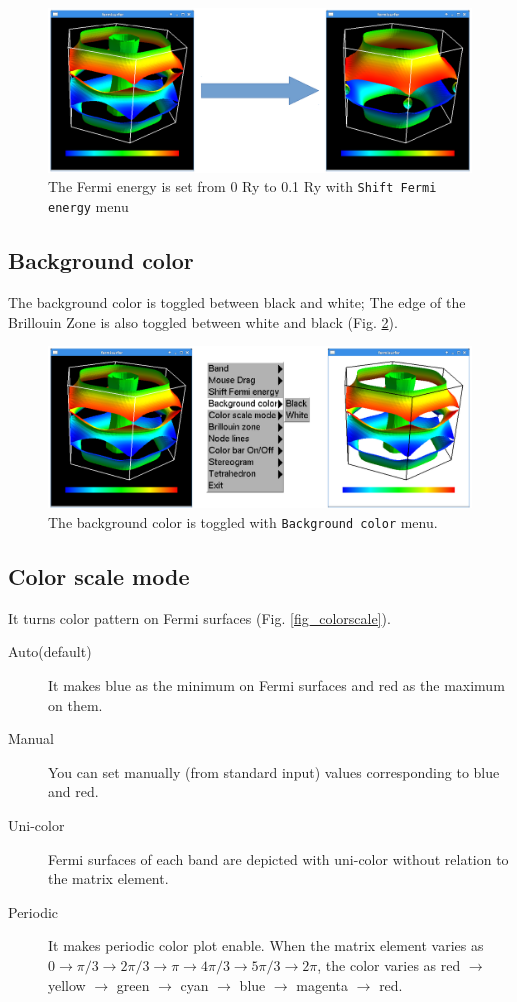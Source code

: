 \documentclass[12pt]{article}
\begin{document}
\begin{figure}[!ht]
  \includegraphics[width=17cm]{figs/shift.eps}
  \caption{The Fermi energy is set from 0 Ry to 0.1 Ry 
    with \texttt{Shift Fermi energy} menu}
  \label{fig_shift}
\end{figure}

\subsection{Background color}

The background color is toggled between black and white;
The edge of the Brillouin Zone is also toggled 
between white and black (Fig. \ref{fig_background}). 

\begin{figure}[!ht]
  \includegraphics[width=17cm]{figs/background.eps}
  \caption{The background color is toggled with \texttt{Background color} menu.}
  \label{fig_background}
\end{figure}

\subsection{Color scale mode}

It turns color pattern on Fermi surfaces (Fig. \ref{fig_colorscale}). 
\begin{description}
\item[Auto(default)] 
  It makes blue as the minimum on Fermi surfaces and
  red as the maximum on them.
\item[Manual] You can set manually (from standard input) 
  values corresponding to blue and red.
\item[Uni-color] Fermi surfaces of each band are depicted with uni-color
  without relation to the matrix element.
\item[Periodic] It makes periodic color plot enable.
  When the matrix element varies as 
  $0 \rightarrow \pi/3 \rightarrow 2\pi/3 \rightarrow \pi \rightarrow 
  4\pi/3 \rightarrow 5\pi/3 \rightarrow 2\pi$,
  the color varies as 
  red $\rightarrow$ yellow $\rightarrow$ green $\rightarrow$
  cyan $\rightarrow$ blue $\rightarrow$ magenta $\rightarrow$ red. 
\end{description}
\end{document}
